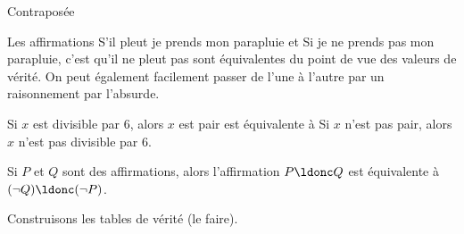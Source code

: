 \documentclass[french,xcolor=svgnames]{beamer}
\begin{document}
\begin{frame}{Contraposée}
  \begin{example}\pause{}
    Les affirmations \og S'il pleut je prends mon parapluie\fg{} et\pause{} \og Si je ne prends pas mon parapluie, c'est qu'il ne pleut pas\fg{}\pause{} sont équivalentes du point de vue des valeurs de vérité.\pause{} On peut également facilement passer de l'une à l'autre par un raisonnement par l'absurde.
  \end{example}

  \begin{example}\pause{}
    \og Si \(x\) est divisible par \(6\), alors \(x\) est pair\fg{}\pause{} est équivalente à \og Si \(x\) n'est pas pair, alors \(x\) n'est pas divisible par \(6\)\fg{}.
  \end{example}\pause{}

  \begin{theorem}\pause{}
    Si $P$ et $Q$ sont des affirmations,\pause{} alors l'affirmation $P \ldonc Q$ est équivalente à\pause{} $(\neg Q) \ldonc (\neg P)$.
  \end{theorem}\pause{}
  Construisons les tables de vérité\pause{} (le faire).
\end{frame}
\end{document}
